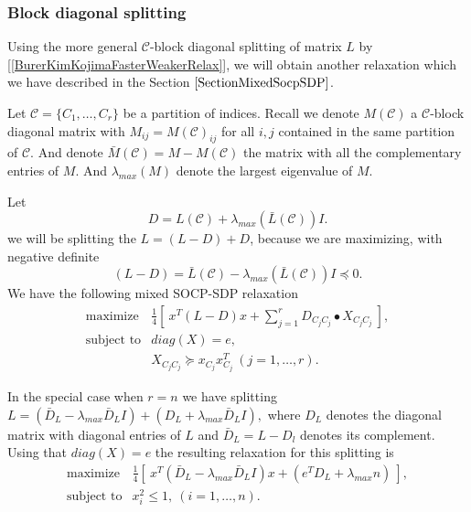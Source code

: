 \documentclass[12pt]{book}
\theoremstyle{definition}
\begin{document}
\subsubsection{Block diagonal splitting}

Using the more general $\mathcal{C}$-block diagonal splitting of matrix $L$ by [\ref{BurerKimKojimaFasterWeakerRelax}], we will obtain another relaxation which we have described in the Section $\ref{SectionMixedSocpSDP}$. 

Let $\mathcal{C}=\{C_1,\dots ,C_r\}$ be a partition of indices. Recall we denote $M(\mathcal{C})$ a $\mathcal{C}$-block diagonal matrix with $M_{ij} = M(\mathcal{C})_{ij}$ for all $i,j$ contained in the same partition of $\mathcal{C}$. And denote $\bar{M}(\mathcal{C}) = M-M(\mathcal{C})$ the matrix with all the complementary entries of $M$.
And $\lambda_{max}(M)$ denote the largest eigenvalue of $M$.

Let 
$$ D = L(\mathcal{C}) + \lambda_{max}(\bar{L}(\mathcal{C}))I .$$
we will be splitting the $L = (L - D) + D$, because we are maximizing, with negative definite
$$(L - D)= \bar{L}(\mathcal{C}) - \lambda_{max}(\bar{L}(\mathcal{C}))I \preceq 0.$$
We have the following mixed SOCP-SDP relaxation 
\begin{equation}
\label{MaxCutMixedSocpSdpR}
\begin{array}{ll}
\mbox{maximize} & \frac{1}{4}\left[ \ x^T(L-D)x + \sum_{j=1}^r D_{C_jC_j}\bullet X_{C_jC_j} \ \right], \\
\mbox{subject to} & diag(X) = e ,\\
&	X_{C_jC_j}\succeq x_{C_j}x_{C_j}^T \ (j=1,\dots ,r).
\end{array}
\end{equation}

In the special case when $r = n$ we have splitting
$L = (\bar{D}_L - \lambda_{max}\bar{D}_LI) + (D_L + \lambda_{max}\bar{D}_LI),$
where $D_L$ denotes the diagonal matrix with diagonal entries of $L$
and $\bar{D}_L = L - D_l$ denotes its complement.
Using that $diag(X) = e$ the resulting relaxation for this splitting is
\begin{equation}
\label{MaxCutMixedSocpSdpN}
\begin{array}{ll}
\mbox{maximize} & \frac{1}{4}\left[ \ x^T(\bar{D}_L - \lambda_{max}\bar{D}_LI)x + (e^TD_L + \lambda_{max}n) \ \right], \\
\mbox{subject to} & x_i^2 \leq 1, \ (i=1,\dots ,n).
\end{array}
\end{equation}
\end{document}
